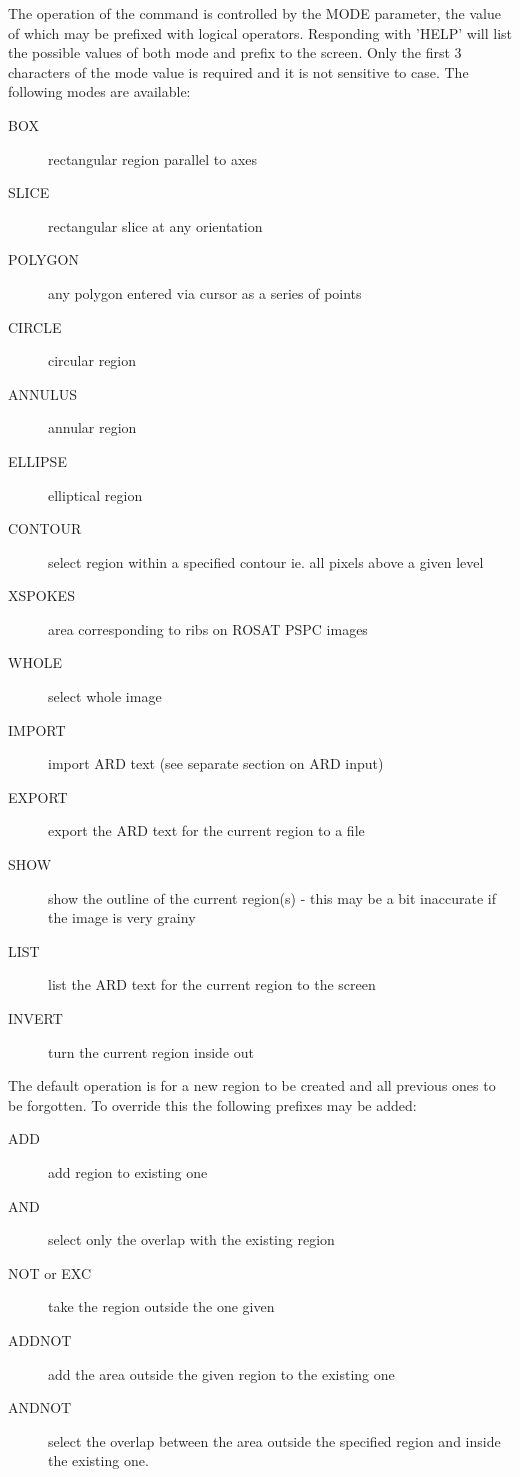 \documentclass{book}
\renewcommand{\_}{{\tt\char'137}}     %
\begin{document}
The operation of the command is controlled by the MODE parameter, the
value of which may be prefixed with logical operators. Responding
with 'HELP' will list the possible values of both mode and prefix
to the screen. Only the first 3 characters of the mode value is
required and it is not sensitive to case. The following modes are
available:


\begin{description}
\item[BOX]
rectangular region parallel to axes
\item[SLICE]
rectangular slice at any orientation
\item[POLYGON]
any polygon entered via cursor as a series of points
\item[CIRCLE]
circular region
\item[ANNULUS]
annular region
\item[ELLIPSE]
elliptical region
\item[CONTOUR]
select region within a specified contour ie. all
pixels above a given level
\item[XSPOKES]
area corresponding to ribs on ROSAT PSPC images
\item[WHOLE]
select whole image
\item[IMPORT]
import ARD text (see separate section on ARD input)
\item[EXPORT]
export the ARD text for the current region to a file
\item[SHOW]
show the outline of the current region(s) - this may be
a bit inaccurate if the image is very grainy
\item[LIST]
list the ARD text for the current region to the screen
\item[INVERT]
turn the current region inside out
\end{description}
The default operation is for a new region to be created and all
previous ones to be forgotten. To override this the following
prefixes may be added:


\begin{description}
\item[ADD]
add region to existing one
\item[AND]
select only the overlap with the existing region
\item[NOT or EXC]
take the region outside the one given
\item[ADDNOT]
add the area outside the given region to the existing one
\item[ANDNOT]
select the overlap between the area outside the specified
region and inside the existing one.
\end{description}
\end{document}

